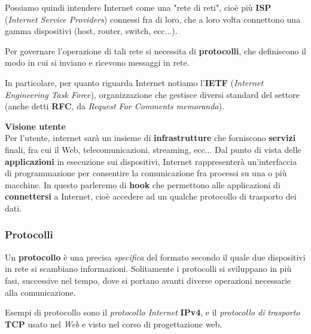 \documentclass[a4paper,11pt]{article}
\begin{document}
\par\medskip

Possiamo quindi intendere Internet come una "rete di reti", cioè più \textbf{ISP} (\textit{Internet Service Providers}) connessi fra di loro, che a loro volta connettono una gamma dispositivi (host, router, switch, ecc...).

Per governare l'operazione di tali rete si necessita di \textbf{protocolli}, che definiscono il modo in cui si inviano e ricevono messaggi in rete.

In particolare, per quanto riguarda Internet notiamo l'\textbf{IETF} (\textit{Internet Engineering Task Force}), organizzazione che gestisce diversi standard del settore (anche detti \textbf{RFC}, da \textit{Request For Comments memoranda}).

\par\medskip
\textbf{\textsf{Visione utente}} \\
\noindent
Per l'utente, internet sarà un insieme di \textbf{infrastrutture} che forniscono \textbf{servizi} finali, fra cui il Web, telecomunicazioni, streaming, ecc...
Dal punto di vista delle \textbf{applicazioni} in esecuzione sui dispositivi, Internet rappresenterà un'interfaccia di programmazione per consentire la comunicazione fra processi su una o più macchine.
In questo parleremo di \textbf{hook} che permettono alle applicazioni di \textbf{connettersi} a Internet, cioè accedere ad un qualche protocollo di trasporto dei dati. 

\subsubsection{Protocolli}
Un \textbf{protocollo} è una precisa \textit{specifica} del formato secondo il quale due dispositivi in rete si scambiano informazioni.
Solitamente i protocolli si sviluppano in più fasi, successive nel tempo, dove si portano avanti diverse operazioni necessarie alla comunicazione.

Esempi di protocollo sono il \textit{protocollo Internet} \textbf{IPv4}, e il \textit{protocollo di trasporto} \textbf{TCP} usato nel \textit{Web} e visto nel corso di progettazione web.
\end{document}
